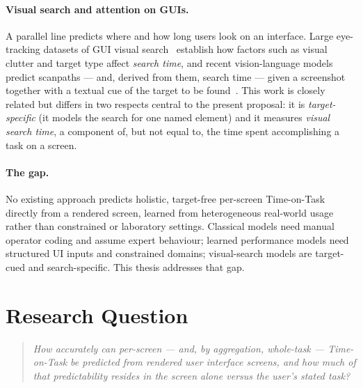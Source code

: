 \documentclass[11pt,a4paper]{article}
\begin{document}
\paragraph{Visual search and attention on GUIs.} A parallel line predicts where and how long users look on an interface. Large eye-tracking datasets of GUI visual search~\cite{vsgui10k} establish how factors such as visual clutter and target type affect \emph{search time}, and recent vision-language models predict scanpaths --- and, derived from them, search time --- given a screenshot together with a textual cue of the target to be found~\cite{seekui}. This work is closely related but differs in two respects central to the present proposal: it is \emph{target-specific} (it models the search for one named element) and it measures \emph{visual search time}, a component of, but not equal to, the time spent accomplishing a task on a screen.

\paragraph{The gap.} No existing approach predicts holistic, target-free per-screen Time-on-Task directly from a rendered screen, learned from heterogeneous real-world usage rather than constrained or laboratory settings. Classical models need manual operator coding and assume expert behaviour; learned performance models need structured UI inputs and constrained domains; visual-search models are target-cued and search-specific. This thesis addresses that gap.

\section{Research Question}
\begin{quote}
\itshape\color{accent}
How accurately can per-screen --- and, by aggregation, whole-task --- Time-on-Task be predicted from rendered user interface screens, and how much of that predictability resides in the screen alone versus the user's stated task?
\end{quote}
\end{document}
